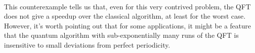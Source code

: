 \documentclass[]{article}
\begin{document}
\\
This counterexample tells us that, even for this very contrived problem, the QFT does not give a speedup over the classical algorithm, at least for the worst case. However, it's worth pointing out that for some applications, it might be a feature that the quantum algorithm with sub-exponentially many runs of the QFT is insensitive to small deviations from perfect periodicity.
\end{document}
